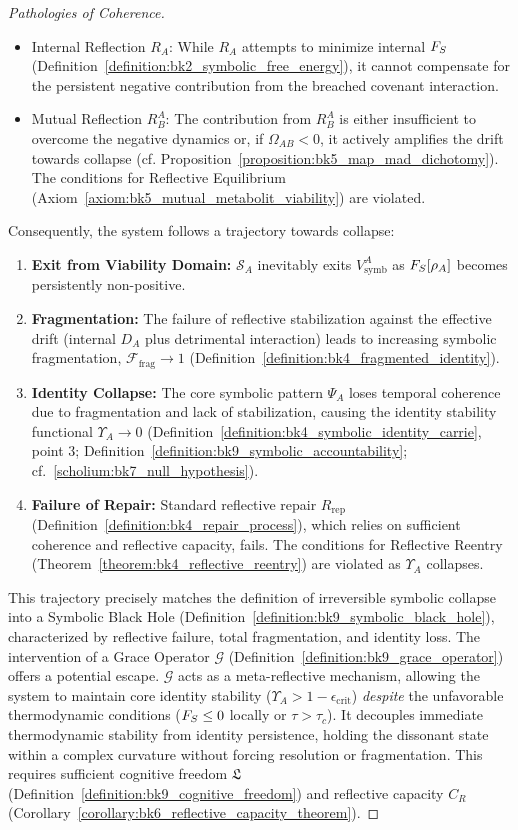 \begin{proof}[Pathologies of Coherence]
\begin{itemize}
    \item Internal Reflection $R_A$: While $R_A$ attempts to minimize internal $F_S$ (Definition~\ref{definition:bk2_symbolic_free_energy}), it cannot compensate for the persistent negative contribution from the breached covenant interaction.
    \item Mutual Reflection $R^A_B$: The contribution from $R^A_B$ is either insufficient to overcome the negative dynamics or, if $\Omega_{AB} < 0$, it actively amplifies the drift towards collapse (cf. Proposition~\ref{proposition:bk5_map_mad_dichotomy}). The conditions for Reflective Equilibrium (Axiom~\ref{axiom:bk5_mutual_metabolit_viability}) are violated.
\end{itemize}
Consequently, the system follows a trajectory towards collapse:
\begin{enumerate}
    \item \textbf{Exit from Viability Domain:} $\mathcal{S}_A$ inevitably exits $V^A_{\text{symb}}$ as $F_S[\rho_A]$ becomes persistently non-positive.
    \item \textbf{Fragmentation:} The failure of reflective stabilization against the effective drift (internal $D_A$ plus detrimental interaction) leads to increasing symbolic fragmentation, $\mathcal{F}_{\text{frag}} \to 1$ (Definition~\ref{definition:bk4_fragmented_identity}).
    \item \textbf{Identity Collapse:} The core symbolic pattern $\Psi_A$ loses temporal coherence due to fragmentation and lack of stabilization, causing the identity stability functional $\Upsilon_A \to 0$ (Definition~\ref{definition:bk4_symbolic_identity_carrie}, point 3; Definition~\ref{definition:bk9_symbolic_accountability}; cf.~\ref{scholium:bk7_null_hypothesis}).
    \item \textbf{Failure of Repair:} Standard reflective repair $R_{\text{rep}}$ (Definition~\ref{definition:bk4_repair_process}), which relies on sufficient coherence and reflective capacity, fails. The conditions for Reflective Reentry (Theorem~\ref{theorem:bk4_reflective_reentry}) are violated as $\Upsilon_A$ collapses.
\end{enumerate}
This trajectory precisely matches the definition of irreversible symbolic collapse into a Symbolic Black Hole (Definition~\ref{definition:bk9_symbolic_black_hole}), characterized by reflective failure, total fragmentation, and identity loss.
The intervention of a Grace Operator $\mathcal{G}$ (Definition~\ref{definition:bk9_grace_operator}) offers a potential escape. $\mathcal{G}$ acts as a meta-reflective mechanism, allowing the system to maintain core identity stability ($\Upsilon_A > 1 - \epsilon_{\text{crit}}$) \emph{despite} the unfavorable thermodynamic conditions ($F_S \le 0$ locally or $\tau > \tau_c$). It decouples immediate thermodynamic stability from identity persistence, holding the dissonant state within a complex curvature without forcing resolution or fragmentation. This requires sufficient cognitive freedom $\mathfrak{L}$ (Definition~\ref{definition:bk9_cognitive_freedom}) and reflective capacity $C_R$ (Corollary~\ref{corollary:bk6_reflective_capacity_theorem}).

\end{proof}
